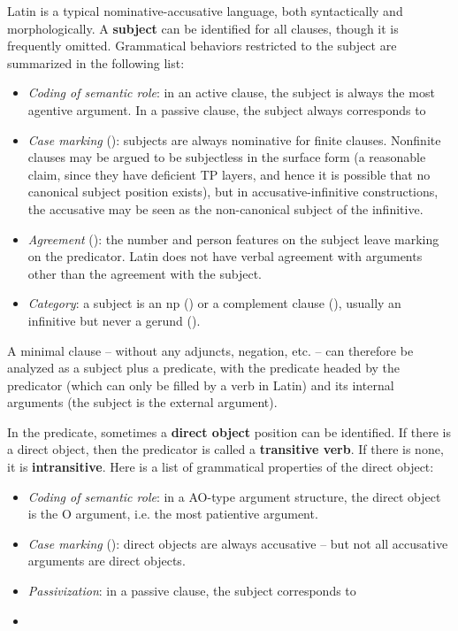 \documentclass{article}
\newcommand*{\concept}[1]{\textbf{#1}}
\begin{document}
Latin is a typical nominative-accusative language, both syntactically and morphologically.
A \concept{subject} can be identified for all clauses, though it is frequently omitted.
Grammatical behaviors restricted to the subject are summarized in the following list: 
\begin{itemize}
    \item \emph{Coding of semantic role}: in an active clause, 
    the subject is always the most agentive argument.
    In a passive clause, the subject always corresponds to %
    \item \emph{Case marking} (): 
    subjects are always nominative for finite clauses. 
    Nonfinite clauses may be argued to be subjectless in the surface form 
    (a reasonable claim, since they have deficient TP layers, 
    and hence it is possible that no canonical subject position exists),
    but in accusative-infinitive constructions, %
    the accusative may be seen as the non-canonical subject of the infinitive.
    \item \emph{Agreement} (): 
    the number and person features on the subject leave marking on the predicator.
    Latin does not have verbal agreement with arguments other than the agreement with the subject.
    \item \emph{Category}: a subject is an \ac{np} () 
    or a complement clause (), 
    usually an infinitive but never a gerund ().
\end{itemize}

A minimal clause -- without any adjuncts, negation, etc. -- can therefore be analyzed as 
a subject plus a predicate,
with the predicate headed by the predicator (which can only be filled by a verb in Latin) 
and its internal arguments
(the subject is the external argument).

In the predicate, sometimes a \concept{direct object} position can be identified.
If there is a direct object, then the predicator is called a \concept{transitive verb}.
If there is none, it is \concept{intransitive}.
Here is a list of grammatical properties of the direct object:
\begin{itemize}
    \item \emph{Coding of semantic role}: in a AO-type argument structure, 
    the direct object is the O argument, i.e. the most patientive argument. 

    \item \emph{Case marking} (): direct objects are always accusative -- 
    but not all accusative arguments are direct objects.
    \item \emph{Passivization}: in a passive clause, the subject corresponds to 
    \item %
\end{itemize}
\end{document}
